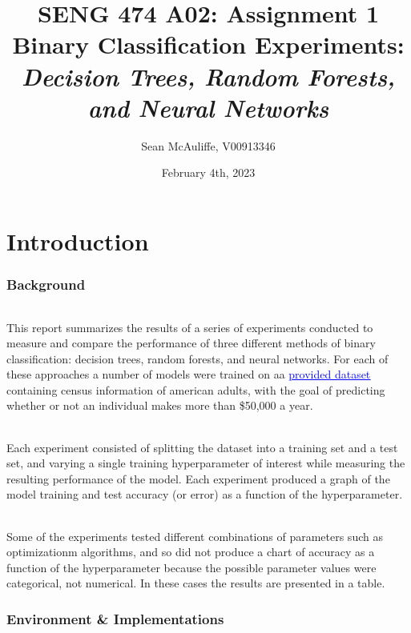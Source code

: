 \documentclass[12pt, letterpaper]{article}
\title{SENG 474 A02: Assignment 1 \\[1ex]
\large Binary Classification Experiments:
\large \textit{Decision Trees, Random Forests, and Neural Networks}}
\author{Sean McAuliffe, V00913346 }
\date{February 4th, 2023}
\begin{document}
\maketitle

\pagebreak
\tableofcontents
\pagebreak

\part*{Introduction}

\section{Background}

\paragraph*{}This report summarizes the results of a series of experiments
conducted to measure and compare the performance of three different methods of
binary classification: decision trees, random forests, and neural networks. For
each of these approaches a number of models were trained on aa
\href{https://archive.ics.uci.edu/ml/datasets/adult}{\textcolor{blue}{\underline{provided dataset}}}
containing census information of american adults, with the goal of predicting
whether or not an individual makes more than \$50,000 a year.

\paragraph*{}Each experiment consisted of splitting the dataset into a
training set and a test set, and varying a single training hyperparameter of
interest while measuring the resulting performance of the model. Each experiment
produced a graph of the model training and test accuracy (or error) as a
function of the hyperparameter.

\paragraph*{}Some of the experiments tested  different combinations of
parameters such as optimizationm algorithms, and so did not produce a chart of
accuracy as a function of the hyperparameter because the possible parameter
values were categorical, not numerical. In these cases the results are
presented in a table.

\section{Environment \& Implementations}
\end{document}

